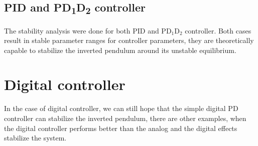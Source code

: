 \subsection{\texorpdfstring{PID and PD\textsubscript{1}D\textsubscript{2} controller}{PID and PD\_1D\_2 controller}}
The stability analysis were done for both PID and PD$_1$D$_2$ controller.
Both cases result in stable parameter ranges for controller parameters, they are theoretically capable to stabilize the inverted pendulum around its unstable equilibrium.


\section{Digital controller}
In the case of digital controller, we can still hope that the simple digital PD controller can stabilize the inverted pendulum, there are other examples, when the digital controller performs better than the analog and the digital effects stabilize the system.

